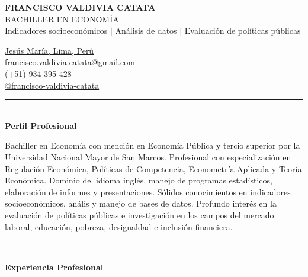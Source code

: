 \documentclass{resume}
\begin{document}
\noindent
\begin{minipage}{0.683\linewidth}
	\MakeUppercase{\LARGE \bf Francisco Valdivia Catata} \\
	\MakeUppercase{Bachiller en Economía} \\
	{\small Indicadores socioeconómicos $|$ Análisis de datos $|$ Evaluación de políticas públicas}
\end{minipage}
\noindent
\begin{minipage}{0.317\textwidth}
	{\color{vino}\faMapMarker} {\href{https://www.google.com/maps/place/Jesús+María/@-12.0786039,-77.0600128,15z/data=!3m1!4b1!4m6!3m5!1s0x9105c8e3646ab8d7:0x848660d2fc40ce50!8m2!3d-12.0824947!4d-77.0506092!16zL20vMDd0Z2c4?entry=ttu}{Jesús María, Lima, Perú}} \\
	{\color{vino}\faEnvelopeSquare} {\href{mailto:francisco.valdivia.catata@gmail.com}{francisco.valdivia.catata@gmail.com}} \\
	{\color{vino}\faPhone} {\href{tel:934395428}{(+51) 934-395-428}} \\
	{\color{vino}\faLinkedinSquare} {\href{https://www.linkedin.com/in/francisco-valdivia-catata/}{@francisco-valdivia-catata}}	
\end{minipage}
\vspace{5pt}


{\color{vino} \noindent \rule{\textwidth}{1pt}} \\
{\color{vino} \noindent \faUser \; {\large \bf Perfil Profesional}}
\vspace{5pt}

\noindent Bachiller en Economía con mención en Economía Pública y tercio superior por la Universidad Nacional Mayor de San Marcos.
Profesional con especialización en Regulación Económica, Políticas de Competencia, Econometría Aplicada y Teoría Económica.
Dominio del idioma inglés, manejo de programas estadísticos, elaboración de informes y presentaciones.
Sólidos conocimientos en indicadores socioeconómicos, anális y manejo de bases de datos.
Profundo interés en la evaluación de políticas públicas e investigación en los campos del mercado laboral, educación, pobreza, desigualdad e inclusión financiera.
\vspace{5pt}


{\color{vino} \noindent \rule{\textwidth}{1pt}} \\
{\color{vino} \noindent \faBriefcase \; {\large \bf Experiencia Profesional}}
\vspace{5pt}
\end{document}
